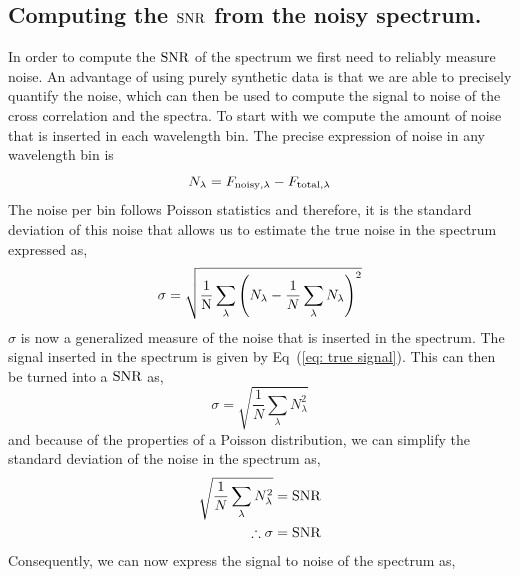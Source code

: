 \subsection{Computing the $\rm{SNR}$ from the noisy spectrum.}
In order to compute the $\rm{SNR}$ of the spectrum we first need to reliably measure noise. 
An advantage of using purely synthetic data is that we are able to precisely quantify the noise, which can then be used to compute the signal to noise of the cross correlation and the spectra.
To start with we compute the amount of noise that is inserted in each wavelength bin.
The precise expression of noise in any wavelength bin is 
\begin{equation}
    N_\lambda = F_{\rm{noisy,\lambda}}- F_{\rm{total,\lambda}}
\end{equation}
The noise per bin follows Poisson statistics and therefore, it is the standard deviation of this noise that allows us to estimate the true noise in the spectrum expressed as,
\begin{equation}
    \sigma = \sqrt{\dfrac{1}{\rm{N}}\sum\limits_{\lambda}\left(N_\lambda-
    \dfrac{1}{N}\sum\limits_{\lambda} N_{\lambda}\right)^2}
    \label{eq:std of noise}
\end{equation}
$\sigma$ is now a generalized measure of the noise that is inserted in the spectrum.
The signal inserted in the spectrum is given by Eq~(\ref{eq: true signal}).
This can then be turned into a $\rm{SNR}$ as,
\begin{equation}
    \sigma = \sqrt{\dfrac{1}{N}\sum\limits_\lambda N^2_\lambda}
\end{equation}
and because of the properties of a Poisson distribution, we can simplify the standard deviation of the noise in the spectrum as,
\begin{eqnarray}
    \sqrt{\dfrac{1}{N}\sum\limits_\lambda N^2_\lambda}&= \rm{SNR}\\
    \therefore \sigma &= \rm{SNR}
\end{eqnarray}
Consequently, we can now express the signal to noise of the spectrum as,
